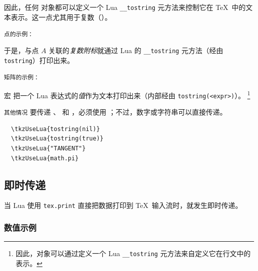 因此，任何  对象都可以定义一个 Lua \texttt{\_\_tostring} 元方法来控制它在 \TeX\ 中的文本表示。这一点尤其用于复数（）。

\medskip
\texttt{点的示例：}
\begin{tkzexample}[latex=.5\textwidth]
\end{tkzexample}

于是，与点 $A$ 关联的\emph{复数附标}就通过 Lua 的 \texttt{\_\_tostring} 元方法（经由 \texttt{tostring}）打印出来。

\medskip
\texttt{矩阵的示例： }

宏  把一个 Lua 表达式的\emph{值}作为文本打印出来（内部经由 \texttt{tostring(<expr>)}）。%
\footnote{因此，对象可以通过定义一个 Lua \texttt{\_\_tostring} 元方法来自定义它在行文中的表示。}


\medskip
\begin{tkzexample}[latex=.5\textwidth]
\end{tkzexample}

\texttt{其他情况}
要传递 、 和 ，必须使用 ；不过，数字或字符串可以直接传递。

\begin{verbatim}
  \tkzUseLua{tostring(nil)}
  \tkzUseLua{tostring(true)}
  \tkzUseLua{"TANGENT"}
  \tkzUseLua{math.pi}
\end{verbatim}
\subsection{即时传递}
\label{subsec:transfer_immediate}

当 Lua 使用 \texttt{tex.print} 直接把数据打印到 \TeX\ 输入流时，就发生即时传递。

\subsubsection*{数值示例}

\begin{tkzexample}[latex=.5\textwidth]
\end{tkzexample}

